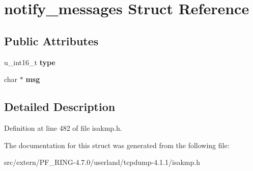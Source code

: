 \hypertarget{structnotify__messages}{
\section{notify\_\-messages Struct Reference}
\label{structnotify__messages}
}
\subsection*{Public Attributes}
\begin{DoxyCompactItemize}
\item 
\hypertarget{structnotify__messages_a9e87fd25a86882289dda00d691300da5}{
u\_\-int16\_\-t {\bfseries type}}
\label{structnotify__messages_a9e87fd25a86882289dda00d691300da5}

\item 
\hypertarget{structnotify__messages_a2ff7311709a16cfcae5ca25a64c541a9}{
char $\ast$ {\bfseries msg}}
\label{structnotify__messages_a2ff7311709a16cfcae5ca25a64c541a9}

\end{DoxyCompactItemize}


\subsection{Detailed Description}


Definition at line 482 of file isakmp.h.



The documentation for this struct was generated from the following file:\begin{DoxyCompactItemize}
\item 
src/extern/PF\_\-RING-\/4.7.0/userland/tcpdump-\/4.1.1/isakmp.h\end{DoxyCompactItemize}
